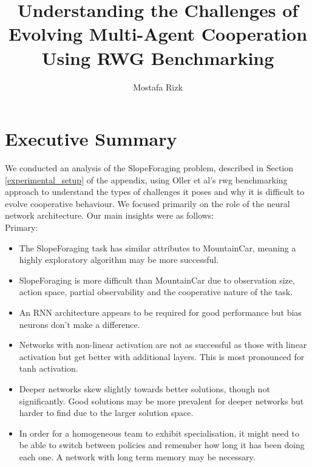 \documentclass[12pt]{article}
\title{Understanding the Challenges of Evolving Multi-Agent Cooperation Using RWG Benchmarking}
\author{Mostafa Rizk}
\begin{document}
\maketitle
\tableofcontents

\section{Executive Summary}

We conducted an analysis of the SlopeForaging problem, described in Section \ref{experimental_setup} of the appendix, using Oller et al's rwg benchmarking approach \cite{oller:AAMAS:2020} to understand the types of challenges it poses and why it is difficult to evolve cooperative behaviour. 
We focused primarily on the role of the neural network architecture.
Our main insights were as follows:\\

Primary:
\begin{itemize}
\item The SlopeForaging task has similar attributes to MountainCar, meaning a highly exploratory algorithm may be more successful.

\item SlopeForaging is more difficult than MountainCar due to observation size, action space, partial observability and the cooperative nature of the task. 

\item An RNN architecture appears to be required for good performance but bias neurons don't make a difference.

\item Networks with non-linear activation are not as successful as those with linear activation but get better with additional layers. 
This is most pronounced for tanh activation.

\item Deeper networks skew slightly towards better solutions, though not significantly. 
Good solutions may be more prevalent for deeper networks but harder to find due to the larger solution space.

\item In order for a homogeneous team to exhibit specialisation, it might need to be able to switch between policies and remember how long it has been doing each one.
A network with long term memory may be necessary.

\end{itemize}
\end{document}
